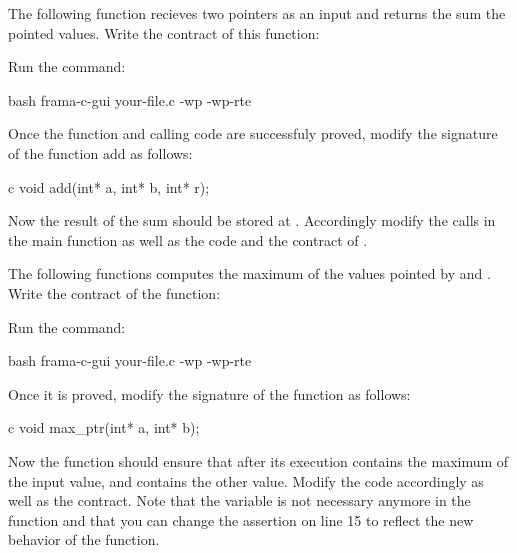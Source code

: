 

The following function recieves two pointers as an input and returns the
sum the pointed values. Write the contract of this function:






Run the command:



\begin{CodeBlock}{bash}
frama-c-gui your-file.c -wp -wp-rte
\end{CodeBlock}



Once the function and calling code are successfuly proved, modify the
signature of the function add as follows:



\begin{CodeBlock}{c}
void add(int* a, int* b, int* r);
\end{CodeBlock}


Now the result of the sum should be stored at . Accordingly
modify the calls in the main function as well as the code and the contract
of .






The following functions computes the maximum of the values pointed by
 and . Write the contract of the function:






Run the command:



\begin{CodeBlock}{bash}
frama-c-gui your-file.c -wp -wp-rte
\end{CodeBlock}



Once it is proved, modify the signature of the function as follows:



\begin{CodeBlock}{c}
void max_ptr(int* a, int* b);
\end{CodeBlock}


Now the function should ensure that after its execution 
contains the maximum of the input value, and  contains the
other value. Modify the code accordingly as well as the contract. Note that
the variable  is not necessary anymore in the 
function and that you can change the assertion on line 15 to reflect the
new behavior of the function.



